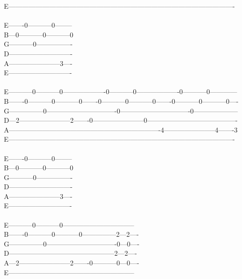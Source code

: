 {E----------------------------------------------------------------------------------------------------\\
\ \ \ \ \ \ \ \ \ \ \ \ \ \ \ \ \ \ \ \ \ \ \ \ \ \ \\
E-------0-----------0--------\\
B---0-----------0-----------0\\
G-----------0----------------\\
D----------------------------\\
A-----------------------3----\\
E----------------------------\\
\\
E-----------0-----------0-------------------0-----------0-------------------0-----------0------------\\
B-------0-----------0-----------0-------0-----------0-----------0-------0-----------0-----------0----\\
G---------------0-------------------------------0-------------------------------0--------------------\\
D---2-----------------------2-------0-----------------------0----------------------------------------\\
A-------------------------------------------------------------------4-----------------------4-------3\\
E----------------------------------------------------------------------------------------------------\\
\\
E-------0-----------0--------\\
B---0-----------0-----------0\\
G-----------0----------------\\
D----------------------------\\
A-----------------------3----\\
E----------------------------\\
\\
E-----------0-----------0--------------------------------\\
B-------0-----------0-----------0---------------2---2----\\
G---------------0-------------------------------0---0----\\
D-----------------------------------------------2---2----\\
A---2-----------------------2-------0-----------0---0----\\
E--------------------------------------------------------\\
}
